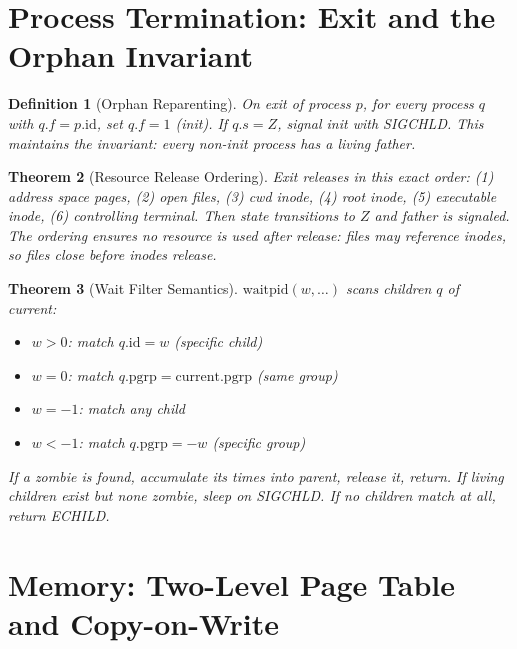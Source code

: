 \documentclass[11pt]{article}
\newtheorem{theorem}{Theorem}[section]
\newtheorem{definition}[theorem]{Definition}
\begin{document}
\section{Process Termination: Exit and the Orphan Invariant}

\begin{definition}[Orphan Reparenting]
On exit of process $p$, for every process $q$ with $q.f = p.\text{id}$,
set $q.f = 1$ (init). If $q.s = Z$, signal init with SIGCHLD.
This maintains the invariant: every non-init process has a living father.
\end{definition}

\begin{theorem}[Resource Release Ordering]
Exit releases in this exact order:
(1) address space pages, (2) open files, (3) cwd inode,
(4) root inode, (5) executable inode, (6) controlling terminal.
Then state transitions to $Z$ and father is signaled.
The ordering ensures no resource is used after release:
files may reference inodes, so files close before inodes release.
\end{theorem}

\begin{theorem}[Wait Filter Semantics]
$\text{waitpid}(w, \ldots)$ scans children $q$ of current:
\begin{itemize}
\item $w > 0$: match $q.\text{id} = w$ (specific child)
\item $w = 0$: match $q.\text{pgrp} = \text{current}.\text{pgrp}$ (same group)
\item $w = -1$: match any child
\item $w < -1$: match $q.\text{pgrp} = -w$ (specific group)
\end{itemize}
If a zombie is found, accumulate its times into parent, release it,
return. If living children exist but none zombie, sleep on SIGCHLD.
If no children match at all, return ECHILD.
\end{theorem}


\section{Memory: Two-Level Page Table and Copy-on-Write}
\end{document}
